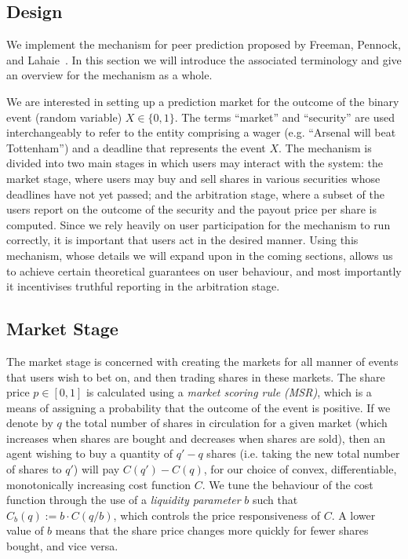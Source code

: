 \documentclass[10pt,a4paper]{article}
\theoremstyle{plain}
\theoremstyle{definition}
\begin{document}
\subsection{Design}

\label{sec:design}

We implement the mechanism for peer prediction proposed by Freeman, Pennock,
and Lahaie~\cite{CODiPM}. In this section we will introduce the associated
terminology and give an overview for the mechanism as a whole.

We are interested in setting up a prediction market for the outcome of the
binary event (random variable) $X \in \{0,1\}$. The terms ``market'' and
``security'' are used interchangeably to refer to the entity comprising a wager
(e.g. ``Arsenal will beat Tottenham'') and a deadline that represents the event
$X$. The mechanism is divided into two main stages in which users may interact
with the system: the market stage, where users may buy and sell shares in
various securities whose deadlines have not yet passed; and the arbitration
stage, where a subset of the users report on the outcome of the security and
the payout price per share is computed. Since we rely heavily on user
participation for the mechanism to run correctly, it is important that users
act in the desired manner. Using this mechanism, whose details we
will expand upon in the coming sections, allows us to achieve certain
theoretical guarantees on user behaviour, and most importantly it incentivises
truthful reporting in the arbitration stage.

\subsection{Market Stage}

The market stage is concerned with creating the markets for all manner of
events that users wish to bet on, and then trading shares in these markets. The
share price $p \in [0,1]$ is calculated using a \emph{market scoring rule
(MSR)}, which is a means of assigning a probability that the outcome of the
event is positive. If we denote by $q$ the total number of shares in
circulation for a given market (which increases when shares are bought and
decreases when shares are sold), then an agent wishing to buy a quantity of
$q'-q$ shares (i.e. taking the new total number of shares to $q'$) will pay
$C(q')-C(q)$, for our choice of convex, differentiable, monotonically
increasing cost function $C$. We tune the behaviour of the cost function
through the use of a \emph{liquidity parameter} $b$ such that $C_b(q) := b
\cdot C(q/b)$, which controls the price responsiveness of $C$. A lower value of
$b$ means that the share price changes more quickly for fewer shares bought,
and vice versa.
\end{document}
